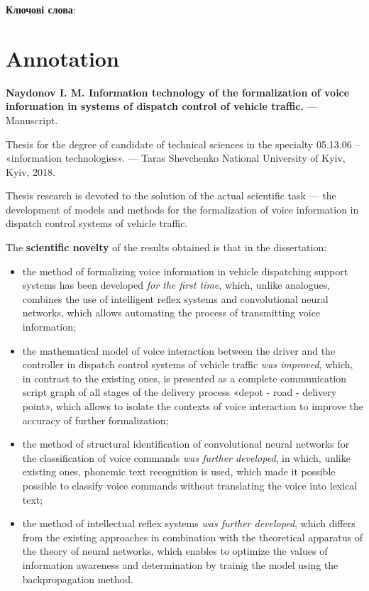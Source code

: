 \textbf{Ключові слова}: \keywords

\chapter*{Annotation}

\textbf{Naydonov I. M. Information technology of the formalization of voice information in systems of dispatch control of vehicle traffic.} --- Manuscript.

Thesis for the degree of candidate of technical sciences in the specialty 05.13.06 -- «information technologies». --- Taras Shevchenko National University of Kyiv, Kyiv, 2018.

Thesis research is devoted to the solution of the actual scientific task --- the development of models and methods for the formalization of voice information in dispatch control systems of vehicle traffic.

The \textbf{scientific novelty} of the results obtained is that in the dissertation:

\begin{itemize}
	\item the method of formalizing voice information in vehicle dispatching support systems has been developed \textit{for the first time}, which, unlike analogues, combines the use of intelligent reflex systems and convolutional neural networks, which allows automating the process of transmitting voice information;
	\item the mathematical model of voice interaction between the driver and the controller in dispatch control systems of vehicle traffic \textit{was improved}, which, in contrast to the existing ones, is presented as a complete communication script graph of all stages of the delivery process «depot - road - delivery point», which allows to isolate the contexts of voice interaction to improve the accuracy of further formalization;
	\item the method of structural identification of convolutional neural networks for the classification of voice commands  \textit{was further developed}, in which, unlike existing ones, phonemic text recognition is used, which made it possible possible to classify voice commands without translating the voice into lexical text;
	\item the method of intellectual reflex systems \textit{was further developed}, which differs from the existing approaches in combination with the theoretical apparatus of the theory of neural networks, which enables to optimize the values of information awareness and determination by trainig the model using the backpropagation method.
\end{itemize}

